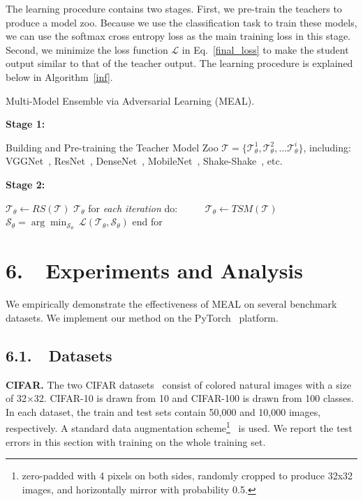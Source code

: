 \documentclass[letterpaper]{article} %
\newcommand{\LL}{\mathcal{L}}
\begin{document}
The learning procedure contains two stages. First, we pre-train the teachers to produce a model zoo. Because we use the classification task to train these models, we can use the softmax cross entropy loss as the main training loss in this stage. Second, we minimize the loss function $\LL$ in Eq.~\ref{final_loss} to make the student output similar to that of the teacher output. The learning procedure is explained below in Algorithm~\ref{inf}.

\begin{algorithm}[h]
	\small
	\caption{Multi-Model Ensemble via Adversarial Learning (MEAL).}
	\label{inf}
	{\bf Stage 1:} 
	
	Building and Pre-training the Teacher Model Zoo $\mathcal{T}=\{\mathcal{T}_\theta^1,\mathcal{T}_\theta^2, \dots \mathcal{T}_\theta^i\}$, including: VGGNet~\cite{simonyan2014very}, ResNet~\cite{he2016deep}, DenseNet~\cite{huang2016densely}, MobileNet~\cite{howard2017mobilenets}, Shake-Shake~\cite{gastaldi2017shake}, etc.
	
	{\bf Stage 2:} 
	\begin{algorithmic}[1]
		\State $\mathcal{T}_\theta \leftarrow RS(\mathcal{T})$ 
		\State \Return $\mathcal{T}_\theta$
		\EndFunction
		\State	for {\em {each iteration}} do:
		\State \ \ \ \ \ $\mathcal{T}_\theta \leftarrow TSM(\mathcal{T})$
		\State \ \ \ \ \ $\mathcal{S}_\theta = \arg \min _{\mathcal{S}_\theta}\ {\LL}(\mathcal{T}_\theta,\mathcal{S}_\theta)$
		\State end for
	\end{algorithmic}
\end{algorithm}


\section{6.~~Experiments and Analysis} \label{exp}
We empirically demonstrate the effectiveness of MEAL on several benchmark datasets. We implement our method on the PyTorch~\cite{paszke2017automatic} platform.
\subsection{6.1.~~Datasets}

{\bf CIFAR.} The two CIFAR datasets~\cite{krizhevsky2009learning} consist of colored natural images with a size of 32$\times$32. CIFAR-10 is drawn from 10 and CIFAR-100 is drawn from 100 classes. In each dataset, the train and test sets contain 50,000 and 10,000 images, respectively. A standard data augmentation scheme\footnote{zero-padded with 4 pixels on both sides, randomly cropped to produce 32x32 images, and horizontally mirror with probability 0.5.}~\cite{lee2015deeply,romero2015fitnets,larsson2016fractalnet,huang2017snapshot,liu2017learning} is used.  We report the test errors in this section with training on the whole training set.
\end{document}
